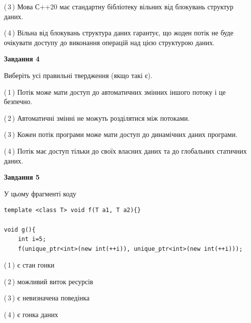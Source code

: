 \documentclass[12pt, ukrainian]{article}
\begin{document}
\begin {large}
{(\,3\,) Мова С++20 має стандартну бібліотеку вільних від блокувань структур даних.%

(\,4\,) Вільна від блокувань структура даних гарантує, що жоден потік не буде очікувати доступу до виконання операцій над цією структурою даних.%



\begin{center}
\textbf{Завдання 4}
\end{center}
Виберіть усі правильні твердження (якщо такі є).\par
\vspace{2mm}

(\,1\,) Потік може мати доступ до автоматичних змінних іншого потоку і це безпечно.%

(\,2\,) Автоматичні змінні не можуть розділятися між потоками.%

(\,3\,) Кожен потік програми може мати доступ до динамічних даних програми.%

(\,4\,) Потік має доступ тільки до своїх власних даних та до глобальних статичних даних.%



\begin{center}
\textbf{Завдання 5}
\end{center}
У цьому фрагменті коду
\begin{verbatim}
template <class T> void f(T a1, T a2){}

void g(){
    int i=5;
    f(unique_ptr<int>(new int(++i)), unique_ptr<int>(new int(++i)));
\end{verbatim}

(\,1\,) є стан гонки%

(\,2\,) можливий виток ресурсів%

(\,3\,) є невизначена поведінка%

(\,4\,) є гонка даних%


}
\end {large}
\end{document}
